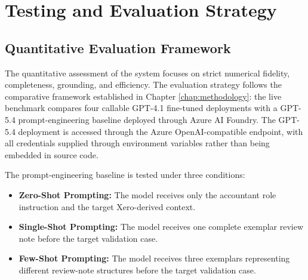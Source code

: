 
\chapter{Testing and Evaluation Strategy}
\label{chap:testing_evaluation}

\section{Quantitative Evaluation Framework}
The quantitative assessment of the system focuses on strict numerical fidelity, completeness, grounding, and efficiency. The evaluation strategy follows the comparative framework established in Chapter \ref{chap:methodology}: the live benchmark compares four callable GPT-4.1 fine-tuned deployments with a GPT-5.4 prompt-engineering baseline deployed through Azure AI Foundry. The GPT-5.4 deployment is accessed through the Azure OpenAI-compatible endpoint, with all credentials supplied through environment variables rather than being embedded in source code.

The prompt-engineering baseline is tested under three conditions:
\begin{itemize}
    \item \textbf{Zero-Shot Prompting:} The model receives only the accountant role instruction and the target Xero-derived context.
    \item \textbf{Single-Shot Prompting:} The model receives one complete exemplar review note before the target validation case.
    \item \textbf{Few-Shot Prompting:} The model receives three exemplars representing different review-note structures before the target validation case.
\end{itemize}

